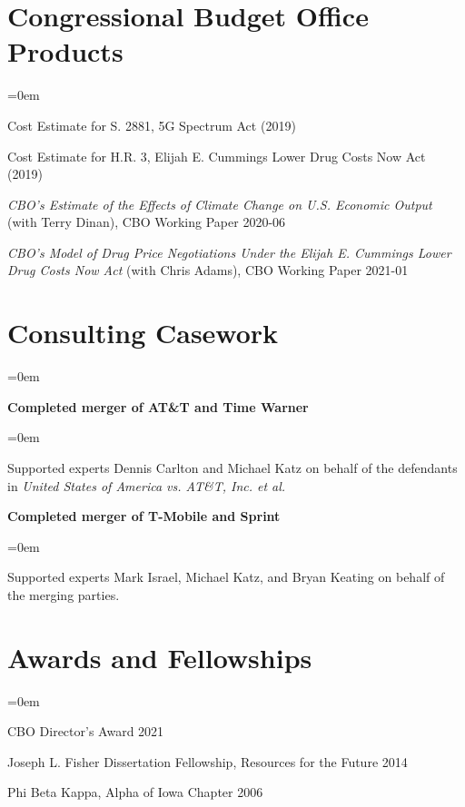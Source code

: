 \documentclass[letterpaper]{article}
\renewenvironment{itemize}{
  \vspace{-0.5em}
  \begin{list}{}{
	\itemsep=0em
    \setlength{\leftmargin}{1.5em}
  }
}{
  \end{list}
}
\begin{document}
\section*{Congressional Budget Office Products}
\begin{itemize}
\item Cost Estimate for S. 2881, 5G Spectrum Act (2019)
\item Cost Estimate for H.R. 3, Elijah E. Cummings Lower Drug Costs Now Act (2019)
\item \textit{CBO’s Estimate of the Effects of Climate Change on U.S. Economic Output} (with Terry Dinan), CBO Working Paper 2020-06
\item \textit{CBO’s Model of Drug Price Negotiations Under the Elijah E. Cummings Lower Drug Costs Now Act} (with Chris Adams), CBO Working Paper 2021-01
\end{itemize}

\section*{Consulting Casework}
\begin{itemize}
\item \textbf{Completed merger of AT\&T and Time Warner}
\begin{itemize}
\item Supported experts Dennis Carlton and Michael Katz on behalf of the defendants in \textit{United States of America vs. AT\&T, Inc. et al.}
\end{itemize}
\item \textbf{Completed merger of T-Mobile and Sprint}
\begin{itemize}
\item Supported experts Mark Israel, Michael Katz, and Bryan Keating on behalf of the merging parties.
\end{itemize}
\end{itemize}

\section*{Awards and Fellowships}
\begin{itemize}
\item CBO Director's Award \hfill 2021
\item Joseph L. Fisher Dissertation Fellowship, Resources for the Future	\hfill 2014
\item Phi Beta Kappa, Alpha of Iowa Chapter	\hfill 2006
\end{itemize}
\end{document}
